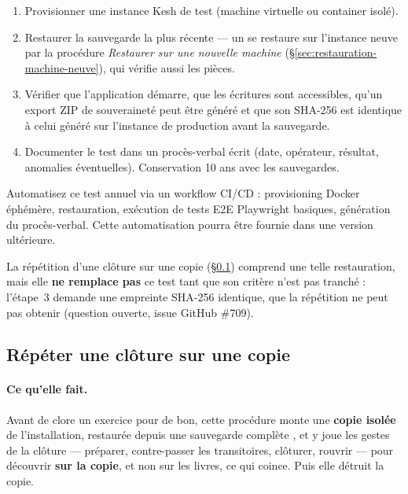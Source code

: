 \documentclass[a4paper,11pt,oneside]{article}
\begin{document}
\begin{enumerate}
    \item Provisionner une instance Kesh de test (machine virtuelle ou container isolé).
    \item Restaurer la sauvegarde la plus récente --- un  se restaure sur l'instance neuve par la procédure \emph{Restaurer sur une nouvelle machine} (\S\ref{sec:restauration-machine-neuve}), qui vérifie aussi les pièces.
    \item Vérifier que l'application démarre, que les écritures sont accessibles, qu'un export ZIP de souveraineté peut être généré et que son SHA-256 est identique à celui généré sur l'instance de production avant la sauvegarde.
    \item Documenter le test dans un procès-verbal écrit (date, opérateur, résultat, anomalies éventuelles). Conservation 10 ans avec les sauvegardes.
\end{enumerate}

\begin{keshtip}
Automatisez ce test annuel via un workflow CI/CD : provisioning Docker éphémère, restauration, exécution de tests E2E Playwright basiques, génération du procès-verbal. Cette automatisation pourra être fournie dans une version ultérieure.
\end{keshtip}

La répétition d'une clôture sur une copie (\S\ref{sec:repetition-cloture}) comprend une telle restauration, mais elle \textbf{ne remplace pas} ce test tant que son critère n'est pas tranché : l'étape~3 demande une empreinte SHA-256 identique, que la répétition ne peut pas obtenir (question ouverte, issue GitHub \#709).

\subsection{Répéter une clôture sur une copie}\label{sec:repetition-cloture}
\begingroup
{}

\paragraph{Ce qu'elle fait.} Avant de clore un exercice pour de bon, cette procédure monte une \textbf{copie isolée} de l'installation, restaurée depuis une sauvegarde complète , et y joue les gestes de la clôture --- préparer, contre-passer les transitoires, clôturer, rouvrir --- pour découvrir \textbf{sur la copie}, et non sur les livres, ce qui coince. Puis elle détruit la copie.
\end{document}
